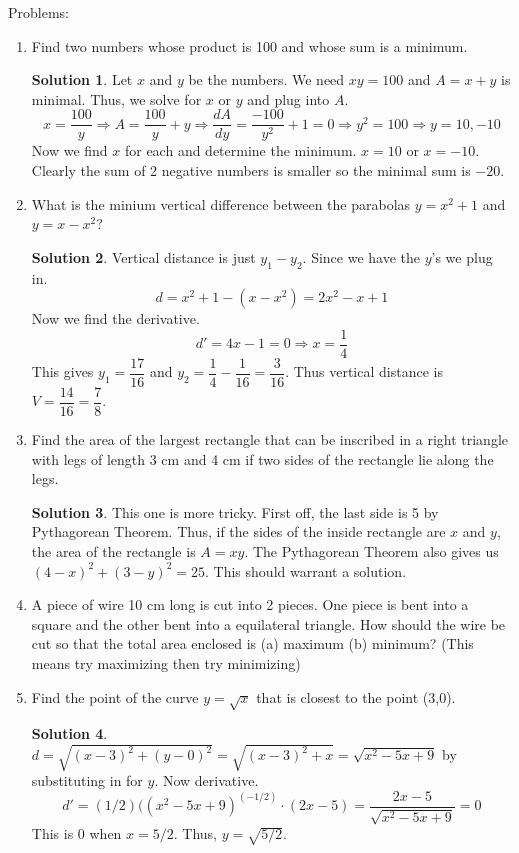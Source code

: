 \documentclass[10pt]{article}
\theoremstyle{Theorem}
\theoremstyle{definition}
\newtheorem*{solution}{Solution}
\theoremstyle{remark}
\theoremstyle{custom}
\begin{document}
\newpage
\noindent Problems:
\begin{enumerate}[1.]
\item Find two numbers whose product is 100 and whose sum is a minimum.
\begin{solution}
Let $x$ and $y$ be the numbers. We need $xy=100$ and $A=x+y$ is minimal. Thus, we solve for $x$ or $y$ and plug into $A$. 
\[
x=\dfrac{100}{y} \Rightarrow A=\dfrac{100}{y}+y \Rightarrow \dfrac{dA}{dy}=\dfrac{-100}{y^2}+1=0 \Rightarrow y^2=100 \Rightarrow y=10, -10
\]
Now we find $x$ for each and determine the minimum. $x=10$ or $x=-10$. Clearly the sum of 2 negative numbers is smaller so the minimal sum is $-20$. 
\end{solution}
\item What is the minium vertical difference between the parabolas $y=x^2+1$ and $y=x-x^2$?
\begin{solution}
Vertical distance is just $y_1-y_2$. Since we have the $y$'s we plug in. 
\[
d=x^2+1-(x-x^2)=2x^2-x+1
\] 
Now we find the derivative.
\[
d'=4x-1=0 \Rightarrow x=\dfrac{1}{4}
\]
This gives $y_1=\dfrac{17}{16}$ and $y_2=\dfrac{1}{4}-\dfrac{1}{16}=\dfrac{3}{16}$. Thus vertical distance is $V=\dfrac{14}{16}=\dfrac{7}{8}$.
\end{solution}
\item Find the area of the largest rectangle that can be inscribed in a right triangle with legs of length 3 cm and 4 cm if two sides of the rectangle lie along the legs. 
\begin{solution}
This one is more tricky. First off, the last side is 5 by Pythagorean Theorem. Thus, if the sides of the inside rectangle are $x$ and $y$, the area of the rectangle is $A=xy$. The Pythagorean Theorem also gives us $(4-x)^2+(3-y)^2=25$. This should warrant a solution.
\end{solution}
\item A piece of wire 10 cm long is cut into 2 pieces. One piece is bent into a square and the other bent into a equilateral triangle. How should the wire be cut so that the total area enclosed is (a) maximum (b) minimum? (This means try maximizing then try minimizing)
\item Find the point of the curve $y=\sqrt{x}$ that is closest to the point (3,0).
\begin{solution}
$d=\sqrt{(x-3)^2+(y-0)^2}=\sqrt{(x-3)^2+x}=\sqrt{x^2-5x+9}$ by substituting in for $y$. Now derivative. 
\[
d'=(1/2)((x^2-5x+9)^{(-1/2)}\cdot (2x-5)=\dfrac{2x-5}{\sqrt{x^2-5x+9}}=0
\]
This is 0 when $x=5/2$. Thus, $y=\sqrt{5/2}$.

\end{solution}
\end{enumerate}
\end{document}
